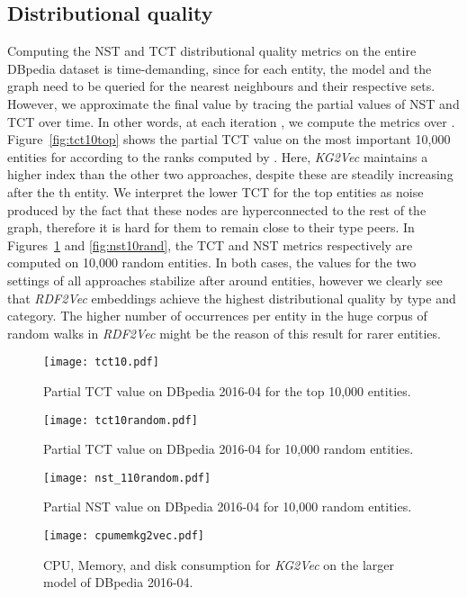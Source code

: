 \documentclass[graybox]{archivesofdatascience}
\newcommand{\ktvplain}{KG2Vec\xspace}
\newcommand{\ktv}{\textit{\ktvplain}\xspace}
\newcommand{\rtv}{\textit{RDF2Vec}\xspace}
\begin{document}
\vspace{-1cm}

\subsection{Distributional quality}

Computing the NST and TCT distributional quality metrics on the entire DBpedia dataset is time-demanding, since for each entity, the model and the graph need to be queried for the  nearest neighbours and their respective sets.
However, we approximate the final value by tracing the partial values of NST and TCT over time.
In other words, at each iteration , we compute the metrics over .
Figure~\ref{fig:tct10top} shows the partial TCT value on the most important 10,000 entities for  according to the ranks computed by \cite{Thalhammer2016}.
Here, \ktv maintains a higher index than the other two approaches, despite these are steadily increasing after the th entity.
We interpret the lower TCT for the top  entities as noise produced by the fact that these nodes are hyperconnected to the rest of the graph, therefore it is hard for them to remain close to their type peers.
In Figures~\ref{fig:tct10rand} and \ref{fig:nst10rand}, the TCT and NST metrics respectively are computed on 10,000 random entities.
In both cases, the values for the two settings of all approaches stabilize after around  entities, however we clearly see that \rtv embeddings achieve the highest distributional quality by type and category.
The higher number of occurrences per entity in the huge corpus of random walks in \rtv might be the reason of this result for rarer entities.

\begin{figure}[htbp]
    \begin{multicols}{2}
    \texttt{[image: tct10.pdf]}\par
	\caption{Partial TCT value on DBpedia 2016-04 for the top 10,000 entities.}
	\label{fig:tct10top}
    \texttt{[image: tct10random.pdf]}\par
	\caption{Partial TCT value on DBpedia 2016-04 for 10,000 random entities.}
	\label{fig:tct10rand}
    \end{multicols}
\end{figure}
\begin{figure}[htbp]
    \begin{multicols}{2}
    \texttt{[image: nst\_110random.pdf]}\par
	\caption{Partial NST value on DBpedia 2016-04 for 10,000 random entities.}
	\label{fig:nst10rand}
    \texttt{[image: cpumemkg2vec.pdf]}\par
	\caption{CPU, Memory, and disk consumption for \ktv on the larger model of DBpedia 2016-04.}
	\label{fig:cpumem}
    \end{multicols}	
\end{figure}
\end{document}

